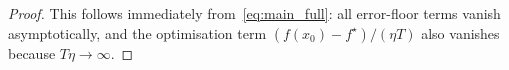 \documentclass[11pt,a4paper]{article}
\newtheorem{lemma}{Lemma}
\theoremstyle{remark}
\newtheorem{remark}{Remark}
\newcommand{\norm}[1]{\left\lVert #1 \right\rVert}
\begin{document}
\begin{proof}
This follows immediately from~\eqref{eq:main_full}: all error-floor terms
vanish asymptotically, and the optimisation term
\((f(x_0)-f^\star)/(\eta T)\) also vanishes because \(T\eta \to \infty\).
\end{proof}

\end{document}
